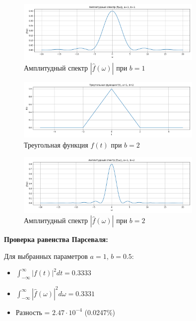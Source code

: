 \begin{figure}[H]
    \centering
    \includegraphics[width=0.8\textwidth]{triangle_spectrum_b1.png}
    \caption{Амплитудный спектр $|\hat{f}(\omega)|$ при $b = 1$}
\end{figure}

\begin{figure}[H]
    \centering
    \includegraphics[width=0.8\textwidth]{triangle_function_b2.png}
    \caption{Треугольная функция $f(t)$ при $b = 2$}
\end{figure}

\begin{figure}[H]
    \centering
    \includegraphics[width=0.8\textwidth]{triangle_spectrum_b2.png}
    \caption{Амплитудный спектр $|\hat{f}(\omega)|$ при $b = 2$}
\end{figure}

\textbf{Проверка равенства Парсеваля:}

Для выбранных параметров $a = 1$, $b = 0.5$:
\begin{itemize}
    \item $\displaystyle \int_{-\infty}^{\infty} |f(t)|^2 dt = 0.3333$
    \item $\displaystyle \int_{-\infty}^{\infty} |\hat{f}(\omega)|^2 d\omega = 0.3331$
    \item Разность = $2.47 \cdot 10^{-4}$ (0.0247\%)
\end{itemize}

